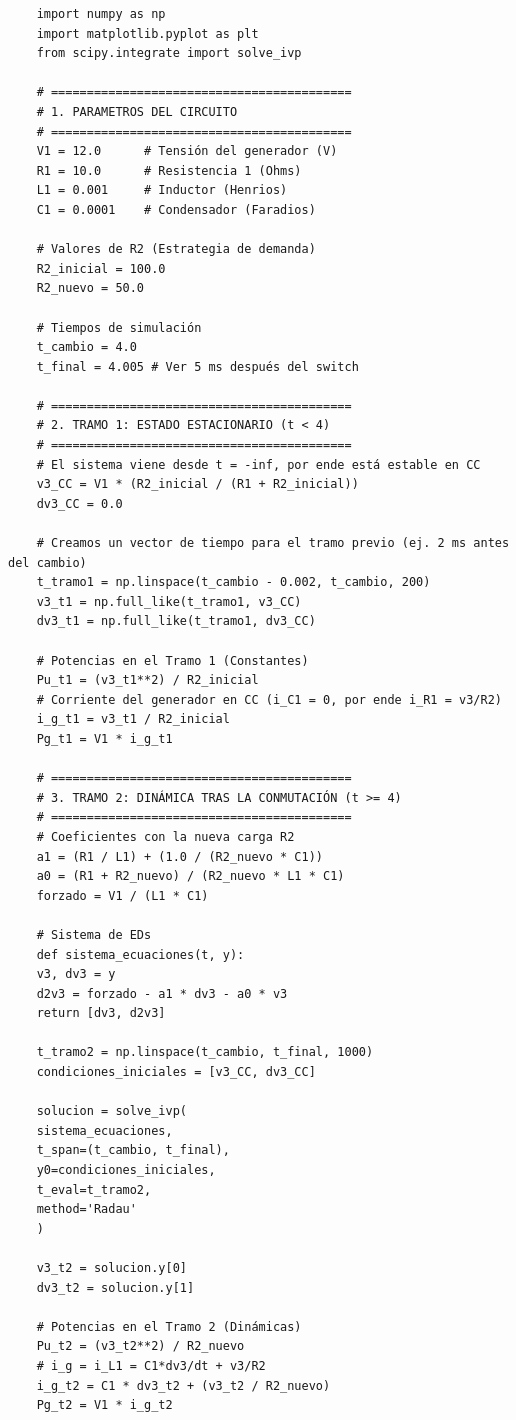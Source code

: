 \documentclass[11pt, a4paper]{article}
\theoremstyle{definition}
\theoremstyle{plain}
\theoremstyle{plain}
\theoremstyle{remark}
\theoremstyle{remark}
\theoremstyle{remark}
\begin{document}
\begin{verbatim}
	import numpy as np
	import matplotlib.pyplot as plt
	from scipy.integrate import solve_ivp
	
	# ==========================================
	# 1. PARAMETROS DEL CIRCUITO
	# ==========================================
	V1 = 12.0      # Tensión del generador (V)
	R1 = 10.0      # Resistencia 1 (Ohms)
	L1 = 0.001     # Inductor (Henrios)
	C1 = 0.0001    # Condensador (Faradios)
	
	# Valores de R2 (Estrategia de demanda)
	R2_inicial = 100.0
	R2_nuevo = 50.0
	
	# Tiempos de simulación
	t_cambio = 4.0
	t_final = 4.005 # Ver 5 ms después del switch
	
	# ==========================================
	# 2. TRAMO 1: ESTADO ESTACIONARIO (t < 4)
	# ==========================================
	# El sistema viene desde t = -inf, por ende está estable en CC
	v3_CC = V1 * (R2_inicial / (R1 + R2_inicial))
	dv3_CC = 0.0
	
	# Creamos un vector de tiempo para el tramo previo (ej. 2 ms antes del cambio)
	t_tramo1 = np.linspace(t_cambio - 0.002, t_cambio, 200)
	v3_t1 = np.full_like(t_tramo1, v3_CC)
	dv3_t1 = np.full_like(t_tramo1, dv3_CC)
	
	# Potencias en el Tramo 1 (Constantes)
	Pu_t1 = (v3_t1**2) / R2_inicial
	# Corriente del generador en CC (i_C1 = 0, por ende i_R1 = v3/R2)
	i_g_t1 = v3_t1 / R2_inicial 
	Pg_t1 = V1 * i_g_t1
	
	# ==========================================
	# 3. TRAMO 2: DINÁMICA TRAS LA CONMUTACIÓN (t >= 4)
	# ==========================================
	# Coeficientes con la nueva carga R2
	a1 = (R1 / L1) + (1.0 / (R2_nuevo * C1))
	a0 = (R1 + R2_nuevo) / (R2_nuevo * L1 * C1)
	forzado = V1 / (L1 * C1)
	
	# Sistema de EDs
	def sistema_ecuaciones(t, y):
	v3, dv3 = y
	d2v3 = forzado - a1 * dv3 - a0 * v3
	return [dv3, d2v3]
	
	t_tramo2 = np.linspace(t_cambio, t_final, 1000)
	condiciones_iniciales = [v3_CC, dv3_CC]
	
	solucion = solve_ivp(
	sistema_ecuaciones, 
	t_span=(t_cambio, t_final), 
	y0=condiciones_iniciales, 
	t_eval=t_tramo2,
	method='Radau'
	)
	
	v3_t2 = solucion.y[0]
	dv3_t2 = solucion.y[1]
	
	# Potencias en el Tramo 2 (Dinámicas)
	Pu_t2 = (v3_t2**2) / R2_nuevo
	# i_g = i_L1 = C1*dv3/dt + v3/R2
	i_g_t2 = C1 * dv3_t2 + (v3_t2 / R2_nuevo)
	Pg_t2 = V1 * i_g_t2
	

\end{verbatim}
\end{document}
